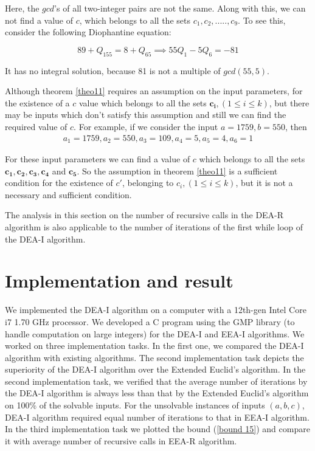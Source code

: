 \documentclass[pdflatex,sn-mathphys-num]{sn-jnl}%
\theoremstyle{thmstyleone}%
\theoremstyle{thmstyletwo}%
\theoremstyle{thmstylethree}%
\begin{document}
Here, the $gcd$'s of all two-integer pairs are not the same. Along with this, we can not find a value of $c$, which belongs to all the sets $c_1,c_2,.....,c_9$. To see this, consider the following Diophantine equation:

$$
89+Q_155=8+Q_65
\implies 55Q_1-5Q_6=-81
$$

It has no integral solution, because 81 is not a multiple of $gcd(55,5)$.
\par Although theorem \ref{theo11} requires an assumption on the input parameters, for the existence of a $c$ value which belongs to all the sets $\mathbf{c_i}, ( 1 \le i \le k)$, but there may be inputs which don't satisfy this assumption and still we can find the required value of $c$. For example, if we consider the input $a=1759,b=550$, then  
\begin{multline}
    a_1=1759, a_2=550, a_3=109, a_4=5, a_5=4, a_6=1
\end{multline}

For these input parameters we can find a value of $c$ which belongs to all the sets $\mathbf{c_1},\mathbf{c_2},\mathbf{c_3},\mathbf{c_4}$ and $\mathbf{c_5}$. So the assumption in theorem \ref{theo11} is a sufficient condition for the existence of $c'$, belonging to $c_i ,(1\le i \le k)$, but it is not a necessary and sufficient condition. 
\par The analysis in this section on the number of recursive calls in the DEA-R algorithm is also applicable to the number of iterations of the first while loop of the DEA-I algorithm.

 
 \section{Implementation and result}\label{secIR}
 We implemented the  DEA-I algorithm on a computer with a 12th-gen Intel Core i7 1.70 GHz processor.  
  We developed a C program using the GMP library \cite{GMP1} (to handle computation on large integers) for the DEA-I and EEA-I algorithms. 
We worked on three implementation tasks. In the first one, we compared the DEA-I algorithm with existing algorithms. The second implementation task depicts the superiority of the DEA-I algorithm over the Extended Euclid's algorithm. In the second implementation task, we verified that the average number of iterations by the DEA-I algorithm is always less than that by the Extended Euclid's algorithm on 100\% of the solvable inputs. For the unsolvable instances of inputs $(a,b,c)$, DEA-I algorithm required equal number of iterations to that in EEA-I algorithm. In the third implementation task we plotted the bound (\ref{bound 15}) and compare it with average number of recursive calls in EEA-R algorithm.
\end{document}
